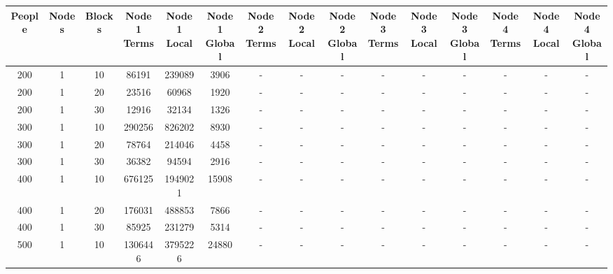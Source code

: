 \documentclass{article}
\begin{document}
    \begin{table}[H]
        \tiny
        \centering
        \begin{center}
            \begin{tabular}{| c | c | c | c | c | c | c | c | c | c | c | c | c | c | c |}
                \hline
                    People & Nodes & Blocks & \thead{\tiny Node 1 \\ \tiny Terms} & \thead{\tiny Node 1 \\ \tiny Local} & \thead{\tiny Node 1 \\ \tiny Global} & \thead{\tiny Node 2 \\ \tiny Terms} & \thead{\tiny Node 2 \\ \tiny Local} & \thead{\tiny Node 2 \\ \tiny Global} & \thead{\tiny Node 3 \\ \tiny Terms} & \thead{\tiny Node 3 \\ \tiny Local} & \thead{\tiny Node 3 \\ \tiny Global} & \thead{\tiny Node 4 \\ \tiny Terms} & \thead{\tiny Node 4 \\ \tiny Local} & \thead{\tiny Node 4 \\ \tiny Global} \\
                \hline
                    200 & 1 & 10 & 86191 & 239089 & 3906 & - & - & - & - & - & - & - & - & - \\
                    200 & 1 & 20 & 23516 & 60968 & 1920 & - & - & - & - & - & - & - & - & - \\
                    200 & 1 & 30 & 12916 & 32134 & 1326 & - & - & - & - & - & - & - & - & - \\
                    300 & 1 & 10 & 290256 & 826202 & 8930 & - & - & - & - & - & - & - & - & - \\
                    300 & 1 & 20 & 78764 & 214046 & 4458 & - & - & - & - & - & - & - & - & - \\
                    300 & 1 & 30 & 36382 & 94594 & 2916 & - & - & - & - & - & - & - & - & - \\
                    400 & 1 & 10 & 676125 & 1949021 & 15908 & - & - & - & - & - & - & - & - & - \\
                    400 & 1 & 20 & 176031 & 488853 & 7866 & - & - & - & - & - & - & - & - & - \\
                    400 & 1 & 30 & 85925 & 231279 & 5314 & - & - & - & - & - & - & - & - & - \\
                    500 & 1 & 10 & 1306446 & 3795226 & 24880 & - & - & - & - & - & - & - & - & - \\

\end{tabular}
\end{center}
\end{table}
\end{document}
